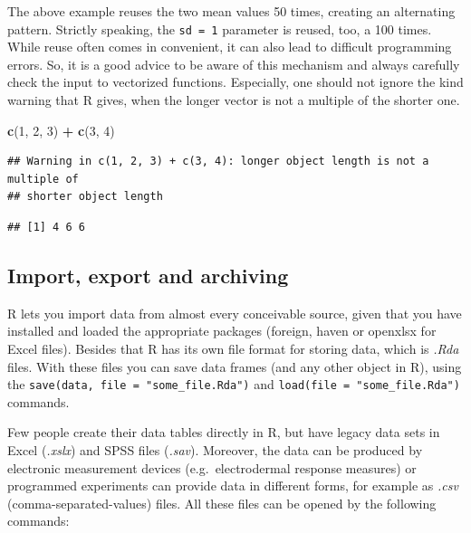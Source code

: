 \documentclass[]{svmono}
\newenvironment{Shaded}{\begin{snugshade}}{\end{snugshade}}
\newcommand{\KeywordTok}[1]{\textcolor[rgb]{0.13,0.29,0.53}{\textbf{#1}}}
\newcommand{\DecValTok}[1]{\textcolor[rgb]{0.00,0.00,0.81}{#1}}
\newcommand{\StringTok}[1]{\textcolor[rgb]{0.31,0.60,0.02}{#1}}
\newcommand{\OperatorTok}[1]{\textcolor[rgb]{0.81,0.36,0.00}{\textbf{#1}}}
\newcommand{\NormalTok}[1]{#1}
\begin{document}
The above example reuses the two mean values 50 times, creating an
alternating pattern. Strictly speaking, the \texttt{sd\ =\ 1} parameter
is reused, too, a 100 times. While reuse often comes in convenient, it
can also lead to difficult programming errors. So, it is a good advice
to be aware of this mechanism and always carefully check the input to
vectorized functions. Especially, one should not ignore the kind warning
that R gives, when the longer vector is not a multiple of the shorter
one.

\begin{Shaded}
\begin{Highlighting}[]
\KeywordTok{c}\NormalTok{(}\DecValTok{1}\NormalTok{, }\DecValTok{2}\NormalTok{, }\DecValTok{3}\NormalTok{) }\OperatorTok{+}\StringTok{ }\KeywordTok{c}\NormalTok{(}\DecValTok{3}\NormalTok{, }\DecValTok{4}\NormalTok{)}
\end{Highlighting}
\end{Shaded}

\begin{verbatim}
## Warning in c(1, 2, 3) + c(3, 4): longer object length is not a multiple of
## shorter object length
\end{verbatim}

\begin{verbatim}
## [1] 4 6 6
\end{verbatim}

\subsection{Import, export and
archiving}\label{import-export-and-archiving}

R lets you import data from almost every conceivable source, given that
you have installed and loaded the appropriate packages (foreign, haven
or openxlsx for Excel files). Besides that R has its own file format for
storing data, which is \emph{.Rda} files. With these files you can save
data frames (and any other object in R), using the
\texttt{save(data,\ file\ =\ "some\_file.Rda")} and
\texttt{load(file\ =\ "some\_file.Rda")} commands.

Few people create their data tables directly in R, but have legacy data
sets in Excel (\emph{.xslx}) and SPSS files (\emph{.sav}). Moreover, the
data can be produced by electronic measurement devices
(e.g.~electrodermal response measures) or programmed experiments can
provide data in different forms, for example as \emph{.csv}
(comma-separated-values) files. All these files can be opened by the
following commands:
\end{document}
